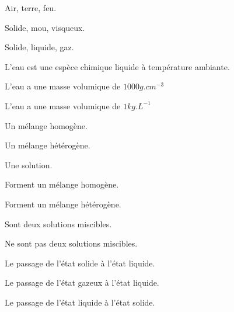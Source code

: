 \newpage
{}

\nomPrenomClasse



\vspace*{-0.3cm}
\begin{qcm}
  \item Air, terre, feu.
  \item Solide, mou, visqueux.
  \item Solide, liquide, gaz.
\end{qcm}

\vspace*{-0.3cm}
\begin{qcm}
  \item L'eau est une espèce chimique liquide à température ambiante.
  \item L'eau a une masse volumique de $1000 \unit{g.cm^{-3}}$
  \item L'eau a une masse volumique de $1 \unit{kg.L^{-1}}$
\end{qcm}

\vspace*{-0.3cm}
\begin{qcm}
  \item Un mélange homogène.
  \item Un mélange hétérogène.
  \item Une solution.
\end{qcm}

\vspace*{-0.3cm}
\begin{qcm}
  \item Forment un mélange homogène.
  \item Forment un mélange hétérogène.
  \item Sont deux solutions miscibles.
  \item Ne sont pas deux solutions miscibles.
\end{qcm}

\vspace*{-0.3cm}
\begin{qcm}
  \item Le passage de l'état solide à l'état liquide.
  \item Le passage de l'état gazeux à l'état liquide.
  \item Le passage de l'état liquide à l'état solide.
\end{qcm}

